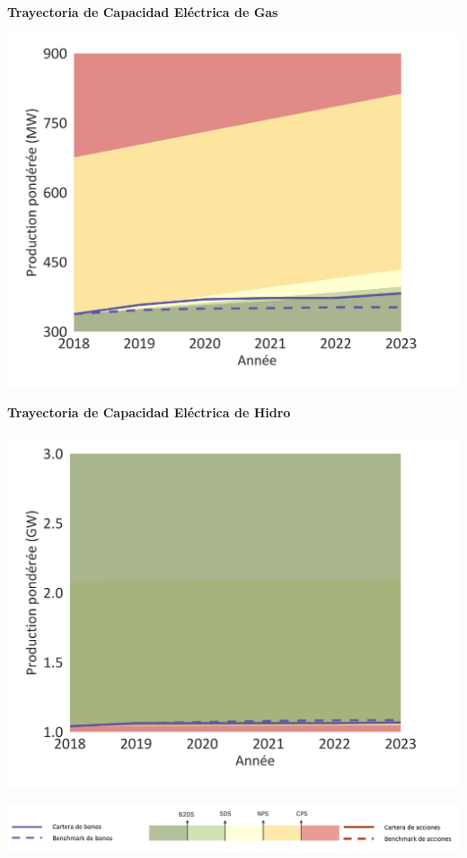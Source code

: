 \documentclass[10pt,table]{article}\usepackage[]{graphicx}\usepackage[]{color}
\begin{document}
	\begin{minipage}[t]{.49\textwidth}
		\textbf{Trayectoria de Capacidad Eléctrica de Gas }
		
		\includegraphics[trim = {0 0cm 0 0},width=1\linewidth]{ReportOutputs/Fig09}
		
		\textbf{Trayectoria de Capacidad Eléctrica de Hidro}
		
		\includegraphics[trim = {0 0cm 0 0},width=1\linewidth]{ReportOutputs/Fig10}
		
	\end{minipage}
	
	\vspace{-0.8cm}
	\begin{center}
		\includegraphics[trim = {0 0cm 0 0},width=.9\linewidth]{ReportGraphics/246Legend_ES.png}
	\end{center}
	
\end{document}
